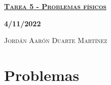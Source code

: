 \documentclass[12pt,letterpaper]{article}
\begin{document}
\pagecolor{gray}
\color{white}

\begin{center}
    {\textcolor{Goldenrod1}{\textbf{\textsc{\underline{\Huge{Tarea 5 - Problemas físicos}}}}}}
\end{center}

\begin{center}
    {\textcolor{Goldenrod1}{\textbf{\textsc{\large{4/11/2022}}}}}
\end{center}

\begin{center}
    {\textcolor{Goldenrod1}{\textsc{Jordán Aarón Duarte Martínez}}}
\end{center}

\section*{Problemas}
\end{document}

